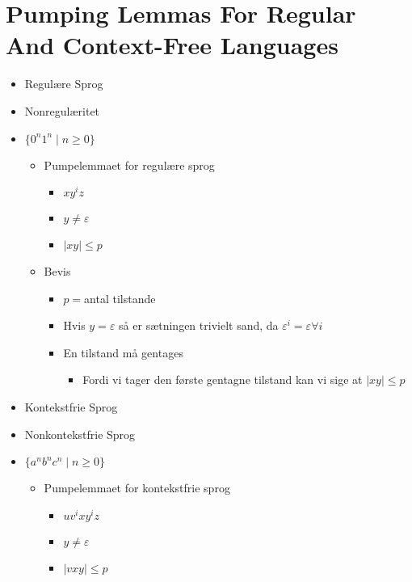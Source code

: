 


\section*{Pumping Lemmas For Regular And Context-Free Languages}

\begin{itemize}
	\item Regulære Sprog
	\item Nonregulæritet
	\item $\{0^{n}1^{n} \mid n \ge 0\}$
	      \begin{itemize}
		      \item Pumpelemmaet for regulære sprog
		            \begin{itemize}
			            \item $xy^{i}z$
			            \item $y \ne \varepsilon$
			            \item $|xy| \le p$
		            \end{itemize}
		      \item Bevis
		            \begin{itemize}
			            \item $p = $antal tilstande
			            \item Hvis $y = \varepsilon$ så er sætningen trivielt sand, da $\varepsilon^{i} = \varepsilon \forall i$
			            \item En tilstand må gentages
			                  \begin{itemize}
				                  \item Fordi vi tager den første gentagne tilstand kan vi sige at $|xy| \le p$
			                  \end{itemize}
		            \end{itemize}
	      \end{itemize}
	\item Kontekstfrie Sprog
	\item Nonkontekstfrie Sprog
	\item $\{a^{n}b^{n}c^{n} \mid n \ge 0\}$
	      \begin{itemize}
		      \item Pumpelemmaet for kontekstfrie sprog
		            \begin{itemize}
			            \item $uv^{i}xy^{i}z$
			            \item $y \ne \varepsilon$
			            \item $|vxy| \le p$

\end{itemize}
\end{itemize}
\end{itemize}
